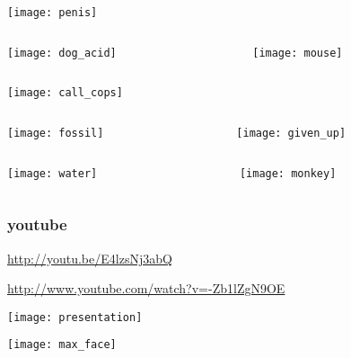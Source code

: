 \documentclass{beamer}
\begin{document}
\begin{frame}
  \texttt{[image: penis]}

\end{frame}

\begin{frame}
  \begin{columns}
    \begin{column}{0.5\textwidth}
      \texttt{[image: dog\_acid]}
    \end{column}
    \begin{column}{0.5\textwidth}
      \texttt{[image: mouse]}
    \end{column}
  \end{columns}
\end{frame}

\begin{frame}
  \texttt{[image: call\_cops]}

\end{frame}

\begin{frame}
  \begin{columns}
    \begin{column}{0.5\textwidth}
      \texttt{[image: fossil]}
    \end{column}
    \begin{column}{0.5\textwidth}
      \texttt{[image: given\_up]}
    \end{column}
  \end{columns}
\end{frame}

\begin{frame}
  \begin{columns}
    \begin{column}{0.5\textwidth}
      \texttt{[image: water]}
    \end{column}
    \begin{column}{0.5\textwidth}
      \texttt{[image: monkey]}
    \end{column}
  \end{columns}
\end{frame}

\begin{frame}
  \frametitle{youtube}

  \url{http://youtu.be/E4lzsNj3abQ}

  \url{http://www.youtube.com/watch?v=-Zb1lZgN9OE}

\end{frame}

\begin{frame}
  \texttt{[image: presentation]}

\end{frame}

\begin{frame}
  \texttt{[image: max\_face]}

\end{frame}
\end{document}
